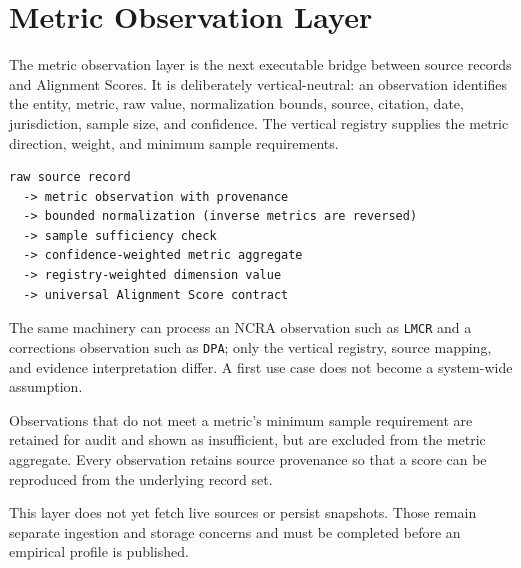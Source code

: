 \section{Metric Observation Layer}

The metric observation layer is the next executable bridge between source
records and Alignment Scores. It is deliberately vertical-neutral: an
observation identifies the entity, metric, raw value, normalization bounds,
source, citation, date, jurisdiction, sample size, and confidence. The
vertical registry supplies the metric direction, weight, and minimum sample
requirements.

\begin{lstlisting}
raw source record
  -> metric observation with provenance
  -> bounded normalization (inverse metrics are reversed)
  -> sample sufficiency check
  -> confidence-weighted metric aggregate
  -> registry-weighted dimension value
  -> universal Alignment Score contract
\end{lstlisting}

The same machinery can process an NCRA observation such as \texttt{LMCR} and
a corrections observation such as \texttt{DPA}; only the vertical registry,
source mapping, and evidence interpretation differ. A first use case does not
become a system-wide assumption.

Observations that do not meet a metric's minimum sample requirement are
retained for audit and shown as insufficient, but are excluded from the
metric aggregate. Every observation retains source provenance so that a score
can be reproduced from the underlying record set.

This layer does not yet fetch live sources or persist snapshots. Those remain
separate ingestion and storage concerns and must be completed before an
empirical profile is published.
